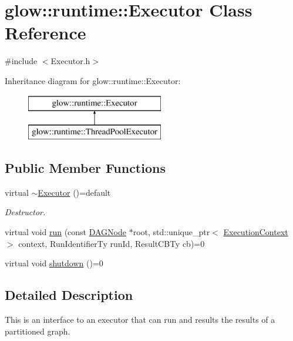 \hypertarget{classglow_1_1runtime_1_1_executor}{}\section{glow\+:\+:runtime\+:\+:Executor Class Reference}
\label{classglow_1_1runtime_1_1_executor}


{\ttfamily \#include $<$Executor.\+h$>$}

Inheritance diagram for glow\+:\+:runtime\+:\+:Executor\+:\begin{figure}[H]
\begin{center}
\leavevmode
\includegraphics[height=2.000000cm]{classglow_1_1runtime_1_1_executor}
\end{center}
\end{figure}
\subsection*{Public Member Functions}
\begin{DoxyCompactItemize}
\item 
\mbox{\label{classglow_1_1runtime_1_1_executor_ab6404a4fbeba2a333ccbd67db5ab51cc}} 
virtual \hyperlink{classglow_1_1runtime_1_1_executor_ab6404a4fbeba2a333ccbd67db5ab51cc}{$\sim$\+Executor} ()=default
\begin{DoxyCompactList}\small\item\em Destructor. \end{DoxyCompactList}\item 
virtual void \hyperlink{classglow_1_1runtime_1_1_executor_aeeef3270a1cdab1923bc75b02be16c07}{run} (const \hyperlink{structglow_1_1runtime_1_1_d_a_g_node}{D\+A\+G\+Node} $\ast$root, std\+::unique\+\_\+ptr$<$ \hyperlink{classglow_1_1_execution_context}{Execution\+Context} $>$ context, Run\+Identifier\+Ty run\+Id, Result\+C\+B\+Ty cb)=0
\item 
virtual void \hyperlink{classglow_1_1runtime_1_1_executor_a2cbbc3a3fef585aed34aba34def2318a}{shutdown} ()=0
\end{DoxyCompactItemize}


\subsection{Detailed Description}
This is an interface to an executor that can run and results the results of a partitioned graph. 

